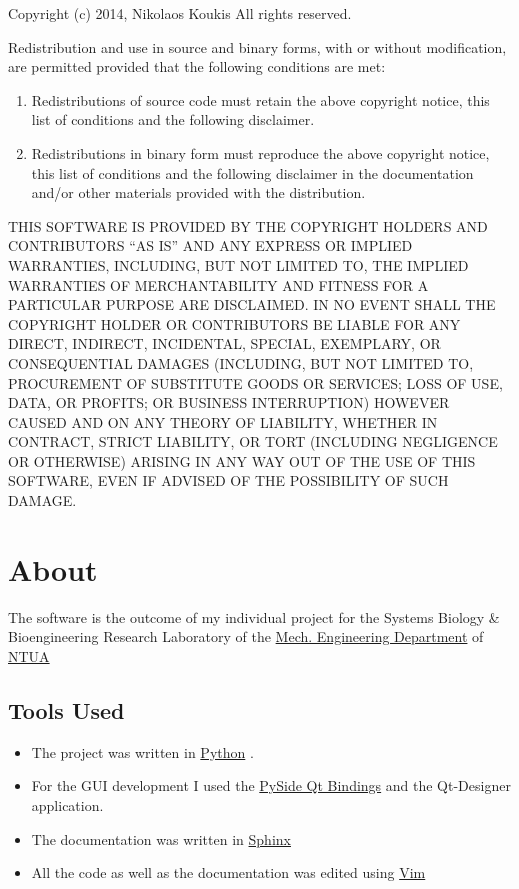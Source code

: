 \documentclass[letterpaper,10pt,english]{sphinxmanual}
\begin{document}
Copyright (c) 2014, Nikolaos Koukis
All rights reserved.

Redistribution and use in source and binary forms, with or without modification, are permitted provided that the following conditions are met:
\begin{enumerate}
\item {} 
Redistributions of source code must retain the above copyright notice, this list of conditions and the following disclaimer.

\item {} 
Redistributions in binary form must reproduce the above copyright notice, this list of conditions and the following disclaimer in the documentation and/or other materials provided with the distribution.

\end{enumerate}

THIS SOFTWARE IS PROVIDED BY THE COPYRIGHT HOLDERS AND CONTRIBUTORS ``AS IS'' AND ANY EXPRESS OR IMPLIED WARRANTIES,
INCLUDING, BUT NOT LIMITED TO, THE IMPLIED WARRANTIES OF MERCHANTABILITY AND FITNESS FOR A PARTICULAR PURPOSE ARE DISCLAIMED.
IN NO EVENT SHALL THE COPYRIGHT HOLDER OR CONTRIBUTORS BE LIABLE FOR ANY DIRECT, INDIRECT, INCIDENTAL, SPECIAL,
EXEMPLARY, OR CONSEQUENTIAL DAMAGES (INCLUDING, BUT NOT LIMITED TO, PROCUREMENT OF SUBSTITUTE GOODS OR SERVICES;
LOSS OF USE, DATA, OR PROFITS; OR BUSINESS INTERRUPTION) HOWEVER CAUSED AND ON ANY THEORY OF LIABILITY,
WHETHER IN CONTRACT, STRICT LIABILITY, OR TORT (INCLUDING NEGLIGENCE OR OTHERWISE) ARISING IN ANY WAY OUT
OF THE USE OF THIS SOFTWARE, EVEN IF ADVISED OF THE POSSIBILITY OF SUCH DAMAGE.


\section{About}
\label{about:about}\label{about::doc}
The software is the outcome of my individual project for the Systems Biology \&
Bioengineering Research Laboratory of the \href{http://www.mech.ntua.gr/en/home}{Mech. Engineering Department} of \href{http://www.ntua.gr/index\_en.html}{NTUA}


\subsection{Tools Used}
\label{about:tools-used}\begin{itemize}
\item {} 
The project was written in \href{http://www.python.org}{Python} .

\item {} 
For the GUI development I used the \href{http://qt-project.org/wiki/pyside}{PySide Qt Bindings} and the Qt-Designer application.

\item {} 
The documentation was written in \href{http://sphinx-doc.org/}{Sphinx}

\item {} 
All the code as well as the documentation was edited using \href{http://www.vim.org/}{Vim}

\end{itemize}
\end{document}
